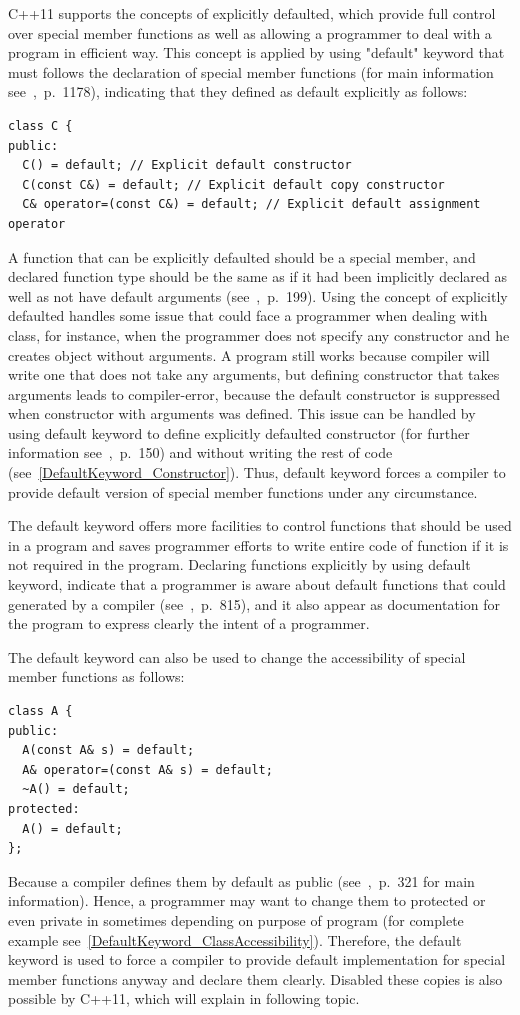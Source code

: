 \documentclass[11pt]{report}
\begin{document}
C++11 supports the concepts of explicitly defaulted, which provide full control over special member functions as well as allowing a programmer to deal with a program in efficient way. This concept is applied by using "default" keyword that must follows the declaration of special member functions (for main information see~\cite{Prata:2012:Cpp},~p.~1178), indicating that they defined as default explicitly as follows:
\begin{lstlisting}
class C {
public:
  C() = default; // Explicit default constructor
  C(const C&) = default; // Explicit default copy constructor
  C& operator=(const C&) = default; // Explicit default assignment operator
\end{lstlisting}
A function that can be explicitly defaulted should be a special member, and declared function type should be the same as if it had been implicitly declared as well as not have default arguments (see~\cite{ISO:2011:Cpplanguage},~p.~199). Using the concept of explicitly defaulted handles some issue that could face a programmer when dealing with class, for instance, when the programmer does not specify any constructor and he creates object without arguments. A program still works because compiler will write one that does not take any arguments, but defining constructor that takes arguments leads to compiler-error, because the default constructor is suppressed when constructor with arguments was defined. This issue can be handled by using default keyword to define explicitly defaulted constructor (for further information see~\cite{Gregorie:professionalcpp},~p.~150) and without writing the rest of code (see~\ref{DefaultKeyword_Constructor}). Thus, default keyword forces a compiler to provide default version of special member functions under any circumstance.

The default keyword offers more facilities to control functions that should be used in a program and saves programmer efforts to write entire code of function if it is not required in the program. Declaring functions explicitly by using default keyword, indicate that a programmer is aware about default functions that could generated by a compiler (see~\cite{Horstmann:2008:BC},~p.~815), and it also appear as documentation for the program to express clearly the intent of a programmer.

The default keyword can also be used to change the accessibility of special member functions as follows:
\begin{lstlisting}
class A {
public:
  A(const A& s) = default;
  A& operator=(const A& s) = default;
  ~A() = default;
protected:
  A() = default;
};\end{lstlisting}
Because a compiler defines them by default as public (see~\cite{Williams:2012:CCA},~p.~321 for main information). Hence, a programmer may want to change them to protected or even private in sometimes depending on purpose of program (for complete example see~\ref{DefaultKeyword_ClassAccessibility}). Therefore, the default keyword is used to force a compiler to provide default implementation for special member functions anyway and declare them clearly. Disabled these copies is also possible by C++11, which will explain in following topic.
\end{document}
